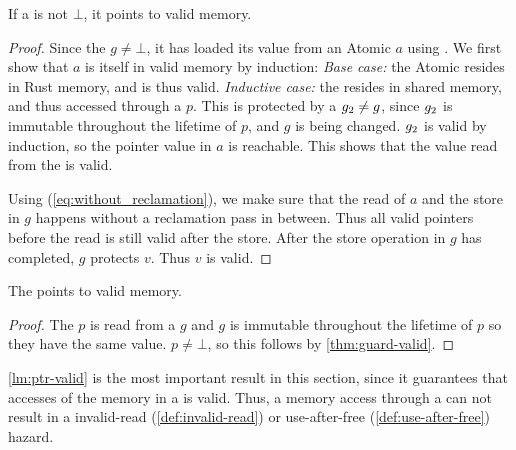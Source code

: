 \begin{theorem}\label{thm:guard-valid}
  If a  is not $\bot$, it points to valid memory.
\end{theorem}
\begin{proof}
  Since the  $g \neq \bot$, it has loaded its value from an Atomic $a$ using
  .  We first show that $a$ is itself in valid memory by induction: \emph{Base
  case:} the Atomic resides in Rust memory, and is thus valid. \emph{Inductive case:} the
   resides in shared memory, and thus accessed through a  $p$.  This  is
  protected by a  $g\sb{2} \neq g$, since $g\sb{2}$ is immutable throughout the lifetime
  of $p$, and $g$ is being changed. $g\sb{2}$ is valid by induction, so the pointer value in $a$ is
  reachable. This shows that the value read from the  is valid.

  Using  (\cref{eq:without_reclamation}), we make sure that the read of $a$
  and the store in $g$ happens without a reclamation pass in between. Thus all valid pointers
  before the read is still valid after the store. After the store operation in $g$ has completed,
  $g$ protects $v$. Thus $v$ is valid.
\end{proof}

\begin{lemma}\label{lm:ptr-valid}
  The  points to valid memory.
\end{lemma}
\begin{proof}
  The   $p$ is read from a  $g$ and $g$ is immutable throughout the lifetime of
  $p$ so they have the same value. $p \neq \bot$, so this follows by \cref{thm:guard-valid}.
\end{proof}

\cref{lm:ptr-valid} is the most important result in this section, since it guarantees that
accesses of the memory in a  is valid. Thus, a memory access through a  can not
result in a invalid-read (\cref{def:invalid-read}) or use-after-free (\cref{def:use-after-free})
hazard.
